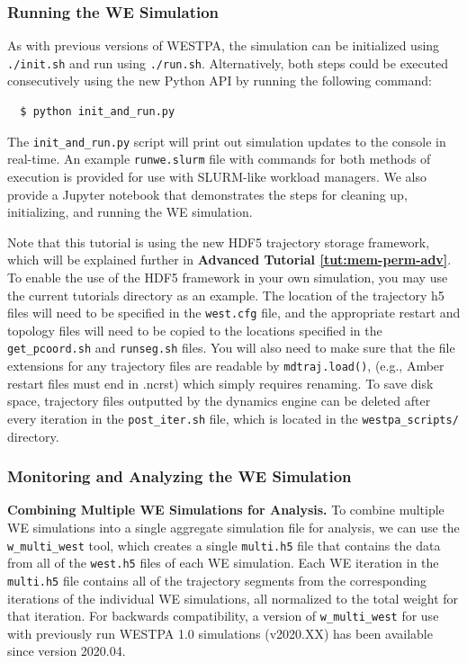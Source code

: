 \subsubsection{Running the WE Simulation}
\label{tut:binless-running}
As with previous versions of WESTPA, the simulation can be initialized using \verb|./init.sh| and run using \verb|./run.sh|. 
Alternatively, both steps could be executed consecutively using the new Python API by running the following command:

\begin{verbatim}
  $ python init_and_run.py
\end{verbatim}

The \verb|init_and_run.py| script will print out simulation updates to the console in real-time. 
An example \verb|runwe.slurm| file with commands for both methods of execution is provided for use with SLURM-like workload managers. 
We also provide a Jupyter notebook that demonstrates the steps for cleaning up, initializing, and running the WE simulation.

Note that this tutorial is using the new HDF5 trajectory storage framework, which will be explained further in \textbf{Advanced Tutorial \ref{tut:mem-perm-adv}}. 
To enable the use of the HDF5 framework in your own simulation, you may use the current tutorials directory as an example. 
The location of the trajectory h5 files will need to be specified in the \verb|west.cfg| file, and the appropriate restart and topology files will need to be copied to the locations specified in the \verb|get_pcoord.sh| and \verb|runseg.sh| files. 
You will also need to make sure that the file extensions for any trajectory files are readable by \verb|mdtraj.load()|, (e.g., Amber restart files must end in .ncrst) which simply requires renaming. 
To save disk space, trajectory files outputted by the dynamics engine can be deleted after every iteration in the \verb|post_iter.sh| file, which is located in the \verb|westpa_scripts/| directory.

\subsubsection{Monitoring and Analyzing the WE Simulation}

\textbf{Combining Multiple WE Simulations for Analysis.} To combine multiple WE simulations into a single aggregate simulation file for analysis, we can use the \verb|w_multi_west| tool, which creates a single \verb|multi.h5| file that contains the data from all of the \verb|west.h5| files of each WE simulation. 
Each WE iteration in the \verb|multi.h5| file contains all of the trajectory segments from the corresponding iterations of the individual WE simulations, all normalized to the total weight for that iteration. 
For backwards compatibility, a version of \verb|w_multi_west| for use with previously run WESTPA 1.0 simulations (v2020.XX) has been available since version 2020.04.

